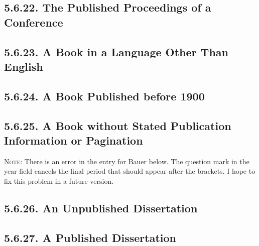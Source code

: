 \documentclass[12pt]{article}
\begin{document}

\subsection*{5.6.22. The Published Proceedings of a Conference}
\newrefsegment

\nocite{freed91aa}\nocite{hualde00aa}\nocite{chang00aa}

\printbibliography[heading=blank,segment=22]

\subsection*{5.6.23. A Book in a Language Other Than English}
\newrefsegment

\nocite{poche77aa}\nocite{maraini00aa}\nocite{esquivel89aa}\nocite{dahlhaus67aa}\nocite{bessiere90aa}

\printbibliography[heading=blank,segment=23]

\subsection*{5.6.24. A Book Published before 1900}
\newrefsegment

\nocite{segni49aa}\nocite{dewey99aa}\nocite{brome73aa}

\printbibliography[heading=blank,segment=24]

\subsection*{5.6.25. A Book without Stated Publication Information or Pagination}
\newrefsegment
\textsc{Note:} There is an error in the entry for Bauer below.  The question mark in the year field cancels the final period that should appear after the brackets.  I hope to fix this problem in a future version.

\nocite{sendak63aa}\nocite{photographic-viewXXaa}\nocite{michelangelo92aa}\nocite{malachi09aa}\nocite{bauer71aa}

\printbibliography[heading=blank,segment=25]

\subsection*{5.6.26. An Unpublished Dissertation}
\newrefsegment

\nocite{kelly01aa}\nocite{boyle83aa}

\printbibliography[heading=blank,segment=26]

\subsection*{5.6.27. A Published Dissertation}
\newrefsegment

\nocite{fullerton01aa}\nocite{dietze82aa}

\printbibliography[heading=blank,segment=27]


\end{document}
